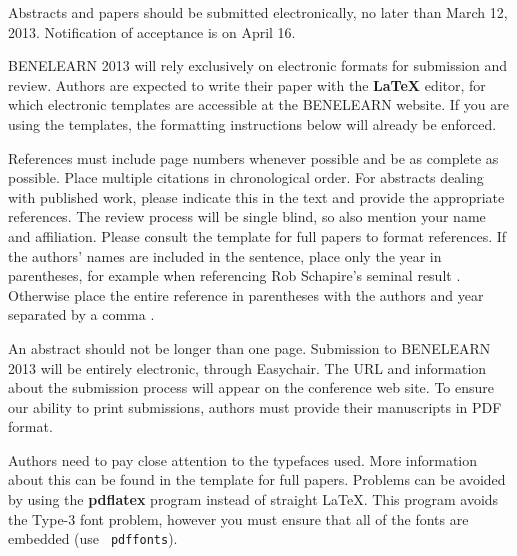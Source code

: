 \documentclass{article}
\begin{document}

Abstracts and papers should be submitted electronically, no later than March 12, 2013. Notification of acceptance is on April 16.

BENELEARN 2013 will rely exclusively on electronic formats for submission and review. Authors are expected to write their paper with the \textbf{\LaTeX} editor, for which electronic templates are accessible at the BENELEARN website. If you are using the templates, the formatting instructions below will already be enforced.

References must include page numbers whenever possible and be as complete as possible. Place multiple citations in chronological order. For abstracts dealing with published work, please indicate this in the text and provide the appropriate references. The review process will be single blind, so also mention your name and affiliation. Please consult the template for full papers to format references. If the authors' names are included in the sentence, place only
the year in parentheses, for example when referencing Rob Schapire's seminal result . Otherwise place the entire reference in parentheses with the authors and year separated by a comma \cite{schapire90,kearns89}.

An abstract should not be longer than one page. Submission to BENELEARN 2013 will be entirely electronic, through Easychair.  The URL and information about the submission process will appear on the conference web site. To ensure our ability to print submissions, authors must provide their manuscripts in PDF format.

Authors need to pay close attention to the typefaces used. More information about this can be found in the template for full papers. Problems can be avoided by using the \textbf{pdflatex} program instead of straight \LaTeX. This program avoids the Type-3 font problem, however you must ensure that all of the fonts are embedded (use {\tt
pdffonts}).
\end{document}

